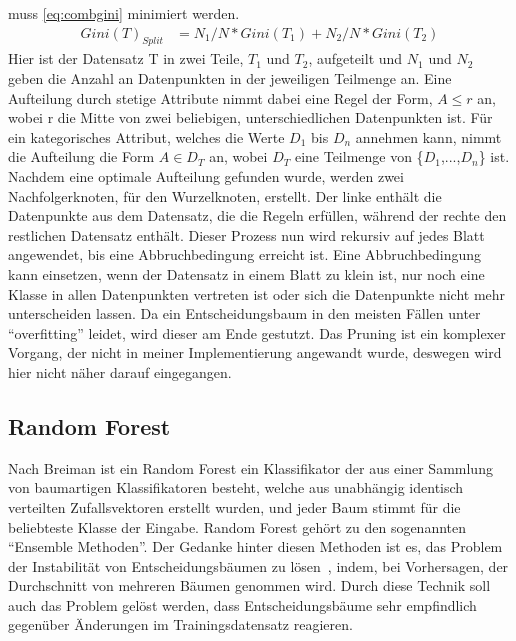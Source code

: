 muss \cref{eq:combgini} minimiert werden.
\begin{align}
    Gini(T)_{Split}       & = N_1/N * Gini(T_1) + N_2/N * Gini(T_2) \label{eq:combgini}
  \end{align}
Hier ist der Datensatz T in zwei Teile, \(T_1\) und \(T_2\), aufgeteilt und \(N_1\) und \(N_2\) geben die Anzahl an Datenpunkten
in der jeweiligen Teilmenge an.
Eine Aufteilung durch stetige Attribute nimmt dabei eine Regel der Form,
 \(A \leq r\) 
an, wobei r die Mitte von zwei beliebigen, unterschiedlichen Datenpunkten ist. Für ein kategorisches Attribut, welches die Werte
\(D_1\) bis \(D_n\) annehmen kann, nimmt die Aufteilung die Form \(A \in D_T\) an, wobei \(D_T\) eine Teilmenge von \{\(D_1\),...,\(D_n\)\} ist.
Nachdem eine optimale Aufteilung gefunden wurde, werden zwei Nachfolgerknoten, für den Wurzelknoten, erstellt.
Der linke enthält die Datenpunkte aus dem Datensatz, die die Regeln erfüllen, während der rechte den restlichen
Datensatz enthält.
Dieser Prozess nun wird rekursiv auf jedes Blatt angewendet, bis eine Abbruchbedingung erreicht ist. Eine Abbruchbedingung
kann einsetzen, wenn der Datensatz in einem Blatt zu klein ist, nur noch eine Klasse in allen Datenpunkten vertreten ist oder
sich die Datenpunkte nicht mehr unterscheiden lassen.
Da ein Entscheidungsbaum in den meisten Fällen unter \enquote{overfitting} leidet, wird dieser am Ende gestutzt.
Das Pruning ist ein komplexer Vorgang, der nicht in meiner Implementierung angewandt wurde, deswegen wird hier nicht näher
darauf eingegangen.

\subsection{Random Forest} \label{sec:randomforest}
Nach Breiman ist ein Random Forest \cite{Breiman2001} ein Klassifikator der aus einer Sammlung von
baumartigen Klassifikatoren besteht, welche aus unabhängig identisch verteilten Zufallsvektoren erstellt wurden,
und jeder Baum stimmt für die beliebteste Klasse der Eingabe.
Random Forest gehört zu den sogenannten \enquote{Ensemble Methoden}. Der Gedanke hinter diesen Methoden ist es,
das Problem der Instabilität von Entscheidungsbäumen zu lösen~\cite{Strobl2009-hw}, indem, bei Vorhersagen, der Durchschnitt von mehreren Bäumen genommen
wird. Durch diese Technik soll auch das Problem gelöst werden, dass Entscheidungsbäume sehr empfindlich gegenüber Änderungen
im Trainingsdatensatz reagieren.

